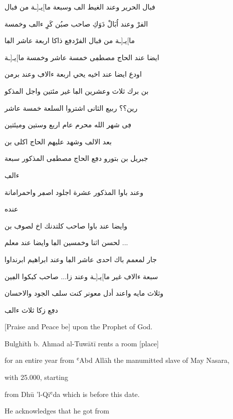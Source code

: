 \documentclass[12pt]{article}
\newcommand{\n}         [1]     %
    {\bgroup\textdir TLT #1\egroup}
\begin{document}
\begin{pages}
\begin{Leftside}
\begin{txarab}
ڧبال الحرير وعند الغيط  الڢ وسبعة ما]يـ[ـة من ڧبال

الڧرْ وعند اُبَالْ دَوَكِ صاحب صبُن كَرِِ ءالڢ وخمسة

ما]يـ[ـة من ڧبال الڧرْدڢع ذاكا اربعة عاشر الڢا

ايضا عند الحاج مصطڢى خمسة عاشر وخمسة ما]يـ[ـة

اودع ايضا عند اخيه يحي اربعة ءالاڢ وعند برمن

بن برك ثلاث وعشرين الڢا غير مئتين واجل المذكو

رين؟؟ ربيع الثانى اشتروا السلعة خمسة عاشر

ڢى شهر الله محرم عام اربع وستين وميئتين

بعد الالڢ\arnote{ديسمبر  \n{1847}} وشهد عليهم الحاج اكلى بن

جبريل بن بتورو دڢع الحاج مصطڢى المذكور سبعة

ءالڢ

وعند باوا المذكور عشرة اجلود اصڢر واحمرامانة

عنده

وايضا عند باوا صاحب كلتدنك اخ لصوڢ بن

لحسن اثنا وخمسين الڢا وايضا عند معلم ...

جار لمعمم باك احدى عاشر الڢا وعند ابراهيم ابرنداوا

سبعة ءالاڢ غير ما]يـ[ـة وعند زا... صاحب كبكوا الڢين


وثلاث مايه واعند أدل معونر كنت سلڢ الجود والاحسان

دڢع زكا ثلاث ءالڢ
\end{txarab}
\pend
\endnumbering
\end{Leftside}


\begin{Rightside}

  
\beginnumberingR
\pstart[\setLTR]
  \begin{LTR}

 \parindent=0pt
[Praise and Peace be] upon the Prophet of God.

Bulghīth b. Ahmad al-Tuwātī rents a room [place]

 for an entire year from ʿAbd Allāh the manumitted slave of May Nasara,

 with 25.000, starting

from Dhū 'l-Qiʿda which is before this date.

He acknowledges that he got from


\end{LTR}
\end{Rightside}
\end{pages}
\end{document}
